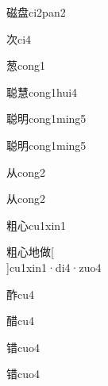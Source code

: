 \begin{verbete}[14;11]{磁盘}{ci2pan2}
\end{verbete}

\begin{verbete}[6]{次}{ci4}
\end{verbete}

\begin{verbete}[12]{葱}{cong1}
\end{verbete}

\begin{verbete}[15;15]{聪慧}{cong1hui4}
\end{verbete}

\begin{verbete}[15;8]{聪明}{cong1ming5}
\end{verbete}

\begin{verbete}[15;8]{聪明}{cong1ming5}
\end{verbete}

\begin{verbete}[4]{从}{cong2}
\end{verbete}
\begin{verbete*}[4]{从}{cong2}
\end{verbete*}

\begin{verbete}[11;4]{粗心}{cu1xin1}
\end{verbete}

\begin{verbete}[11;4;6;11]{粗心地做}[\\]{cu1xin1·di4·zuo4}
\end{verbete}

\begin{verbete}[12]{酢}{cu4}
\end{verbete}

\begin{verbete}[15]{醋}{cu4}
\end{verbete}

\begin{verbete}[13]{错}{cuo4}
\end{verbete}
\begin{verbete*}[13]{错}{cuo4}
\end{verbete*}


